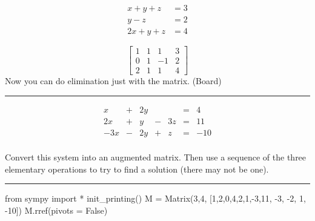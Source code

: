 \documentclass[
  letterpaper,
  DIV=11,
  numbers=noendperiod]{scrartcl}
\newenvironment{Shaded}{\begin{snugshade}}{\end{snugshade}}
\newcommand{\DecValTok}[1]{\textcolor[rgb]{0.68,0.00,0.00}{#1}}
\newcommand{\ImportTok}[1]{\textcolor[rgb]{0.00,0.46,0.62}{#1}}
\newcommand{\NormalTok}[1]{\textcolor[rgb]{0.00,0.23,0.31}{#1}}
\newcommand{\OperatorTok}[1]{\textcolor[rgb]{0.37,0.37,0.37}{#1}}
\newcommand{\VariableTok}[1]{\textcolor[rgb]{0.07,0.07,0.07}{#1}}
\begin{document}
\[\begin{align*}
x + y + z &= 3 \\   
y - z &= 2 \\ 
2x + y + z &= 4 
\end{align*}\]

\[\begin{bmatrix}
1 & 1 & 1 & 3 \\ 
0 & 1 & -1 & 2 \\ 
2 & 1 & 1 & 4
\end{bmatrix}\] Now you can do elimination just with the matrix. (Board)

\begin{center}\rule{0.5\linewidth}{0.5pt}\end{center}

\[\begin{equation*}
\begin{alignedat}{4}
x &  {}+{}  & 2y &  &  &  {}={}  & 4 \\
2x &  {}+{}  & y &  {}-{}  & 3z &  {}={}  & 11 \\
-3x &  {}-{}  & 2y &  {}+{}  & z &  {}={}  & -10 \\
\end{alignedat}
\end{equation*}\]

\begin{tcolorbox}[enhanced jigsaw, coltitle=black, breakable, bottomrule=.15mm, opacitybacktitle=0.6, left=2mm, opacityback=0, rightrule=.15mm, title=\textcolor{quarto-callout-important-color}{\faExclamation}\hspace{0.5em}{Activity}, leftrule=.75mm, toptitle=1mm, colframe=quarto-callout-important-color-frame, toprule=.15mm, colbacktitle=quarto-callout-important-color!10!white, bottomtitle=1mm, titlerule=0mm, arc=.35mm, colback=white]

Convert this system into an augmented matrix. Then use a sequence of the
three elementary operations to try to find a solution (there may not be
one).

\end{tcolorbox}

\begin{center}\rule{0.5\linewidth}{0.5pt}\end{center}

\begin{Shaded}
\begin{Highlighting}[]
\ImportTok{from}\NormalTok{ sympy }\ImportTok{import} \OperatorTok{*} 
\NormalTok{init\_printing()}
\NormalTok{M }\OperatorTok{=}\NormalTok{ Matrix(}\DecValTok{3}\NormalTok{,}\DecValTok{4}\NormalTok{, [}\DecValTok{1}\NormalTok{,}\DecValTok{2}\NormalTok{,}\DecValTok{0}\NormalTok{,}\DecValTok{4}\NormalTok{,}\DecValTok{2}\NormalTok{,}\DecValTok{1}\NormalTok{,}\OperatorTok{{-}}\DecValTok{3}\NormalTok{,}\DecValTok{11}\NormalTok{, }\OperatorTok{{-}}\DecValTok{3}\NormalTok{, }\OperatorTok{{-}}\DecValTok{2}\NormalTok{, }\DecValTok{1}\NormalTok{, }\OperatorTok{{-}}\DecValTok{10}\NormalTok{])}
\NormalTok{M.rref(pivots }\OperatorTok{=} \VariableTok{False}\NormalTok{)}
\end{Highlighting}
\end{Shaded}
\end{document}

